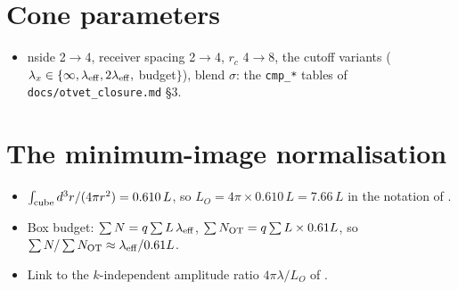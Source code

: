 \documentclass[11pt]{article}
\newcommand{\draft}[1]{\textcolor{orange}{[draft: #1]}}
\newcommand{\Ndir}{N_{\rm OT}}
\begin{document}


\section{Cone parameters}
\begin{itemize}
\item nside 2$\to$4, receiver spacing 2$\to$4, $r_c$ 4$\to$8, the cutoff
  variants ($\lambda_x\in\{\infty,\lambda_{\rm eff},2\lambda_{\rm eff},$
  budget$\}$), blend $\sigma$: the \texttt{cmp\_*} tables of
  \texttt{docs/otvet\_closure.md} \S3.
\end{itemize}

\section{The minimum-image normalisation}\label{app:norm}
\begin{itemize}
\item $\int_{\rm cube}d^3r/(4\pi r^2)=0.610\,L$, so $L_O=4\pi\times0.610\,L=7.66\,L$
  in the notation of \citet{wu21}.
\item Box budget: $\sum N=q\sum L\,\lambda_{\rm eff}$,
  $\sum\Ndir=q\sum L\times0.61L$, so $\sum N/\sum\Ndir\approx\lambda_{\rm eff}/0.61L$.
\item Link to the $k$-independent amplitude ratio $4\pi\lambda/L_O$ of
  \citet{wu21}.
\end{itemize}








\end{document}
